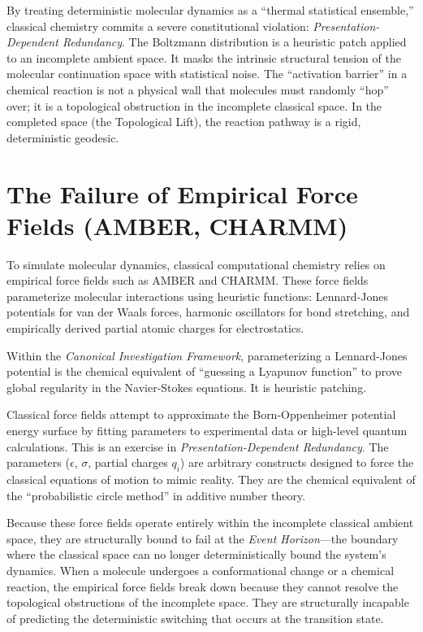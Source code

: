 \documentclass[11pt,openany]{extbook}
\theoremstyle{plain}
\theoremstyle{definition}
\begin{document}
By treating deterministic molecular dynamics as a ``thermal statistical ensemble,'' classical chemistry commits a severe constitutional violation: \emph{Presentation-Dependent Redundancy}. The Boltzmann distribution is a heuristic patch applied to an incomplete ambient space. It masks the intrinsic structural tension of the molecular continuation space with statistical noise. The ``activation barrier'' in a chemical reaction is not a physical wall that molecules must randomly ``hop'' over; it is a topological obstruction in the incomplete classical space. In the completed space (the Topological Lift), the reaction pathway is a rigid, deterministic geodesic.

\section{The Failure of Empirical Force Fields (AMBER, CHARMM)}
To simulate molecular dynamics, classical computational chemistry relies on empirical force fields such as AMBER and CHARMM. These force fields parameterize molecular interactions using heuristic functions: Lennard-Jones potentials for van der Waals forces, harmonic oscillators for bond stretching, and empirically derived partial atomic charges for electrostatics.

Within the \emph{Canonical Investigation Framework}, parameterizing a Lennard-Jones potential is the chemical equivalent of ``guessing a Lyapunov function'' to prove global regularity in the Navier-Stokes equations. It is heuristic patching.

Classical force fields attempt to approximate the Born-Oppenheimer potential energy surface by fitting parameters to experimental data or high-level quantum calculations. This is an exercise in \emph{Presentation-Dependent Redundancy}. The parameters ($\epsilon$, $\sigma$, partial charges $q_i$) are arbitrary constructs designed to force the classical equations of motion to mimic reality. They are the chemical equivalent of the ``probabilistic circle method'' in additive number theory.

Because these force fields operate entirely within the incomplete classical ambient space, they are structurally bound to fail at the \emph{Event Horizon}---the boundary where the classical space can no longer deterministically bound the system's dynamics. When a molecule undergoes a conformational change or a chemical reaction, the empirical force fields break down because they cannot resolve the topological obstructions of the incomplete space. They are structurally incapable of predicting the deterministic switching that occurs at the transition state.
\end{document}
